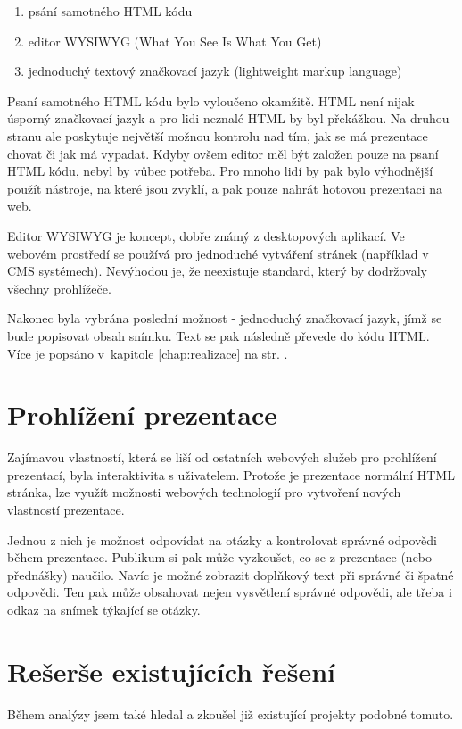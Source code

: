 \documentclass[11pt,twoside,a4paper]{book}
\begin{document}
\begin{enumerate}
	\item psání samotného HTML kódu
	\item editor WYSIWYG (What You See Is What You Get)
	\item jednoduchý textový značkovací jazyk (lightweight markup language)
\end{enumerate}

Psaní samotného HTML kódu bylo vyloučeno okamžitě. HTML není nijak úsporný značkovací jazyk a pro lidi neznalé HTML by
byl překážkou. Na druhou stranu ale poskytuje největší možnou kontrolu nad tím, jak se má prezentace chovat či jak má
vypadat. Kdyby ovšem editor měl být založen pouze na psaní HTML kódu, nebyl by vůbec potřeba. Pro mnoho lidí by pak bylo
výhodnější použít nástroje, na které jsou zvyklí, a pak pouze nahrát hotovou prezentaci na web.

Editor WYSIWYG je koncept, dobře známý z desktopových aplikací. Ve webovém prostředí se používá pro jednoduché vytváření stránek (například v CMS systémech). Nevýhodou je, že neexistuje standard, který by dodržovaly všechny prohlížeče.

Nakonec byla vybrána poslední možnost - jednoduchý značkovací jazyk, jímž se bude popisovat obsah snímku. Text se pak následně převede do kódu HTML. Více je popsáno v~kapitole \ref{chap:realizace}  na str. \pageref{chap:realizace}.

\section{Prohlížení prezentace}
Zajímavou vlastností, která se liší od ostatních webových služeb pro prohlížení prezentací, byla interaktivita s uživatelem. Protože je prezentace normální HTML stránka, lze využít možnosti webových technologií pro vytvoření nových vlastností prezentace.

Jednou z nich je možnost odpovídat na otázky a kontrolovat správné odpovědi během prezentace. Publikum si pak může vyzkoušet, co se z prezentace (nebo přednášky) naučilo. Navíc je možné zobrazit doplňkový text při správné či špatné odpovědi. Ten pak může obsahovat nejen vysvětlení správné odpovědi, ale třeba i odkaz na snímek týkající se otázky.

\section{Rešerše existujících řešení}
Během analýzy jsem také hledal a zkoušel již existující projekty podobné tomuto.
\end{document}
